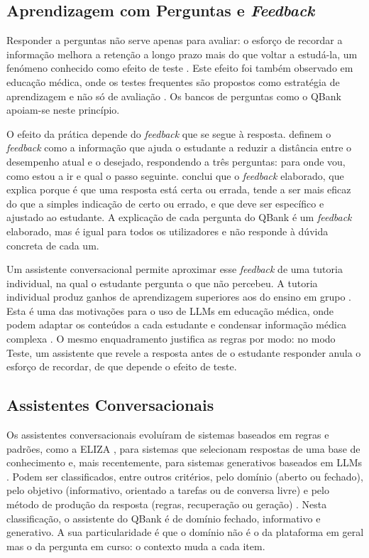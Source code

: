 \subsection{Aprendizagem com Perguntas e \emph{Feedback}}
\label{sec:chap2_learning}

Responder a perguntas não serve apenas para avaliar: o esforço de recordar a informação melhora a retenção a longo prazo mais do que voltar a estudá-la, um fenómeno conhecido como efeito de teste \parencite{roediger2006test}. Este efeito foi também observado em educação médica, onde os testes frequentes são propostos como estratégia de aprendizagem e não só de avaliação \parencite{larsen2008test}. Os bancos de perguntas como o QBank apoiam-se neste princípio.

O efeito da prática depende do \emph{feedback} que se segue à resposta. \textcite{hattie2007power} definem o \emph{feedback} como a informação que ajuda o estudante a reduzir a distância entre o desempenho atual e o desejado, respondendo a três perguntas: para onde vou, como estou a ir e qual o passo seguinte. \textcite{shute2008focus} conclui que o \emph{feedback} elaborado, que explica porque é que uma resposta está certa ou errada, tende a ser mais eficaz do que a simples indicação de certo ou errado, e que deve ser específico e ajustado ao estudante. A explicação de cada pergunta do QBank é um \emph{feedback} elaborado, mas é igual para todos os utilizadores e não responde à dúvida concreta de cada um.

Um assistente conversacional permite aproximar esse \emph{feedback} de uma tutoria individual, na qual o estudante pergunta o que não percebeu. A tutoria individual produz ganhos de aprendizagem superiores aos do ensino em grupo \parencite{bloom1984sigma}. Esta é uma das motivações para o uso de \glspl{LLM} em educação médica, onde podem adaptar os conteúdos a cada estudante e condensar informação médica complexa \parencite{hu2025advancing}. O mesmo enquadramento justifica as regras por modo: no modo Teste, um assistente que revele a resposta antes de o estudante responder anula o esforço de recordar, de que depende o efeito de teste.

\subsection{Assistentes Conversacionais}
\label{sec:chap2_chatbots}

Os assistentes conversacionais evoluíram de sistemas baseados em regras e padrões, como a ELIZA \parencite{weizenbaum1966eliza}, para sistemas que selecionam respostas de uma base de conhecimento e, mais recentemente, para sistemas generativos baseados em \glspl{LLM} \parencite{adamopoulou2020chatbots}. Podem ser classificados, entre outros critérios, pelo domínio (aberto ou fechado), pelo objetivo (informativo, orientado a tarefas ou de conversa livre) e pelo método de produção da resposta (regras, recuperação ou geração) \parencite{adamopoulou2020chatbots}. Nesta classificação, o assistente do QBank é de domínio fechado, informativo e generativo. A sua particularidade é que o domínio não é o da plataforma em geral mas o da pergunta em curso: o contexto muda a cada item.

